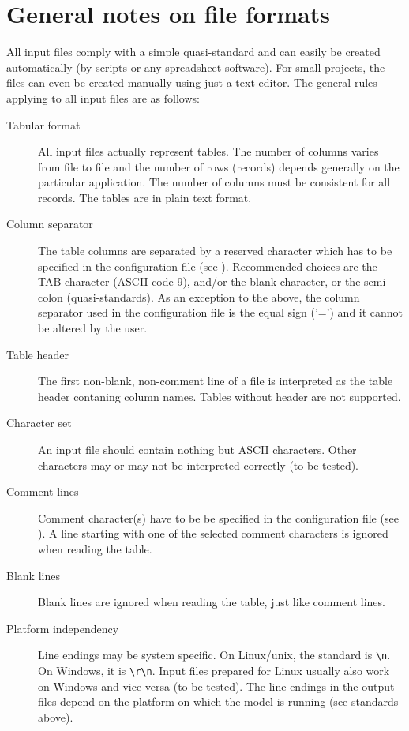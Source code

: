 \section{General notes on file formats} \label{sec:input-formats}

All input files comply with a simple quasi-standard and can easily be created automatically (by scripts or any spreadsheet software). For small projects, the files can even be created manually using just a text editor. The general rules applying to all input files are as follows:
\begin{description}
  \item [Tabular format] All input files actually represent tables. The number of columns varies from file to file and the number of rows (records) depends generally on the particular application. The number of columns must be consistent for all records. The tables are in plain text format.
  \item [Column separator] The table columns are separated by a reserved character which has to be specified in the configuration file (see ). Recommended choices are the TAB-character (ASCII code 9), and/or the blank character, or the semi-colon (quasi-standards). As an exception to the above, the column separator used in the configuration file is the equal sign ('=') and it cannot be altered by the user.
  \item [Table header] The first non-blank, non-comment line of a file is interpreted as the table header contaning column names. Tables without header are not supported.
  \item [Character set] An input file should contain nothing but ASCII characters. Other characters may or may not be interpreted correctly (to be tested).
  \item [Comment lines] Comment character(s) have to be be specified in the configuration file (see ). A line starting with one of the selected comment characters is ignored when reading the table.
  \item [Blank lines] Blank lines are ignored when reading the table, just like comment lines.
  \item [Platform independency] Line endings may be system specific. On Linux/unix, the standard is \verb!\n!. On Windows, it is \verb!\r\n!. Input files prepared for Linux usually also work on Windows and vice-versa (to be tested). The line endings in the output files depend on the platform on which the model is running (see standards above).

\end{description}
